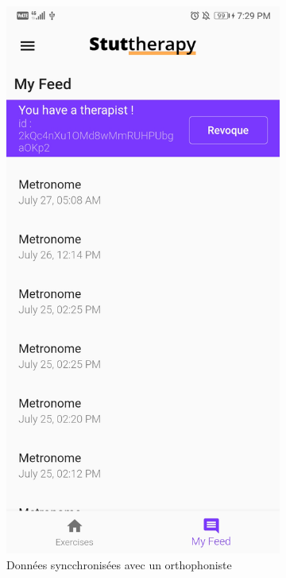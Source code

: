 \begin{appendices}
\begin{landscape}
\begin{figure}[h]
  \begin{subfigure}{.25\textwidth}
    \centering
    \includegraphics[width=.75\linewidth]{content/imgs/screen13.jpg}
    \caption{Données syncchronisées avec un orthophoniste}
  \end{subfigure}%
  \begin{subfigure}{.25\textwidth}
    \centering

\end{subfigure}
\end{figure}
\end{landscape}
\end{appendices}
